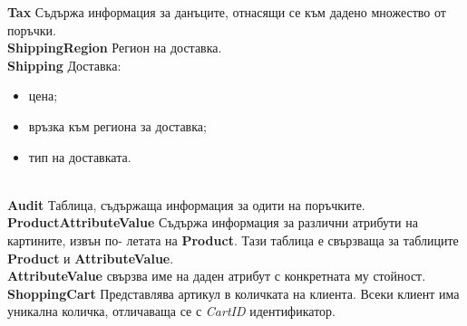 \documentclass[a4paper,14pt]{article}
\begin{document}
\textbf{Tax} Съдържа информация за данъците, отнасящи се към дадено множество от поръчки.\\
\textbf{ShippingRegion} Регион на доставка.\\
\textbf{Shipping} Доставка:
\begin{itemize}
\item цена;
\item връзка към региона за доставка;
\item тип на доставката.
\end{itemize}
\\
\textbf{Audit} Таблица, съдържаща информация за одити на поръчките. \\
\textbf{ProductAttributeValue} Съдържа информация за различни атрибути на картините, извън по-
летата на \textbf{Product}. Тази таблица е свързваща за таблиците \textbf{Product} и \textbf{AttributeValue}.\\
\textbf{AttributeValue} свързва име на даден атрибут с конкретната му стойност.\\
\textbf{ShoppingCart} Представлява артикул в количката на клиента. Всеки клиент има уникална
количка, отличаваща се с \textit{CartID} идентификатор.
\end{document}
